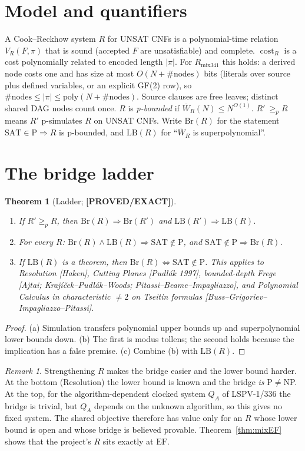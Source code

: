 \documentclass[11pt]{article}
\newtheorem{theorem}{Theorem}
\theoremstyle{definition}
\theoremstyle{remark}
\newtheorem*{remark}{Remark}
\newcommand{\SAT}{\mathrm{SAT}}
\newcommand{\EF}{\mathrm{EF}}
\newcommand{\Rmix}{R_{\mathrm{mix341}}}
\newcommand{\Wbar}{\overline W}
\newcommand{\status}[1]{\textbf{[#1]}}
\begin{document}
\section{Model and quantifiers}
A Cook--Reckhow system $R$ for UNSAT CNFs is a polynomial-time relation $V_R(F,\pi)$
that is sound (accepted $F$ are unsatisfiable) and complete. $\operatorname{cost}_R$ is a cost
polynomially related to encoded length $|\pi|$. For $\Rmix$ this holds: a derived node costs one and
has size at most $O(N+\#\text{nodes})$ bits (literals over source plus defined variables, or an explicit
GF(2) row), so $\#\text{nodes}\le|\pi|\le\mathrm{poly}(N+\#\text{nodes})$.
Source clauses are free leaves; distinct shared DAG nodes count once. $R$ is \emph{p-bounded} if
$\Wbar_R(N)\le N^{O(1)}$. $R'\ \ge_p R$ means $R'$ p-simulates $R$ on UNSAT CNFs.
Write $\mathrm{Br}(R)$ for the statement $\SAT\in\mathrm P\Rightarrow R$ is p-bounded,
and $\mathrm{LB}(R)$ for ``$\Wbar_R$ is superpolynomial''.

\section{The bridge ladder}
\begin{theorem}[Ladder; \status{PROVED/EXACT}]\label{thm:ladder}
\begin{enumerate}
\item[(a)] If $R'\ge_p R$, then $\mathrm{Br}(R)\Rightarrow\mathrm{Br}(R')$ and $\mathrm{LB}(R')\Rightarrow\mathrm{LB}(R)$.
\item[(b)] For every $R$: $\mathrm{Br}(R)\wedge\mathrm{LB}(R)\Rightarrow\SAT\notin\mathrm P$, and
  $\SAT\notin\mathrm P\Rightarrow\mathrm{Br}(R)$.
\item[(c)] If $\mathrm{LB}(R)$ is a theorem, then $\mathrm{Br}(R)\Leftrightarrow\SAT\notin\mathrm P$.
  This applies to Resolution [Haken], Cutting Planes [Pudl\'ak 1997], bounded-depth Frege
  [Ajtai; Kraj\'i\v{c}ek--Pudl\'ak--Woods; Pitassi--Beame--Impagliazzo], and Polynomial Calculus
  in characteristic $\ne 2$ on Tseitin formulas [Buss--Grigoriev--Impagliazzo--Pitassi].
\end{enumerate}
\end{theorem}
\begin{proof}
(a) Simulation transfers polynomial upper bounds up and superpolynomial lower bounds down.
(b) The first is modus tollens; the second holds because the implication has a false premise.
(c) Combine (b) with $\mathrm{LB}(R)$.
\end{proof}
\begin{remark}
Strengthening $R$ makes the bridge easier and the lower bound harder. At the bottom
(Resolution) the lower bound is known and the bridge \emph{is} P$\ne$NP. At the top, for the
algorithm-dependent clocked system $Q_A$ of LSPV-1/336 the bridge is trivial, but $Q_A$ depends on the
unknown algorithm, so this gives no fixed system. The shared objective therefore has value only for
an $R$ whose lower bound is open and whose bridge is believed provable. Theorem~\ref{thm:mixEF} shows
that the project's $R$ sits exactly at $\EF$.
\end{remark}
\end{document}
